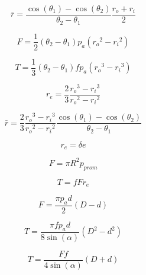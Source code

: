 \documentclass[12pt, letterpaper]{extarticle}
\begin{document}
\begin{equation*}
    \bar{r} = \frac{\cos(\theta_{1}) - \cos(\theta_{2})}{\theta_{2} - \theta_{1}} \frac{r_{o} + r_{i}}{2}
\end{equation*}


\begin{equation*}
    F = \frac{1}{2}(\theta_{2} - \theta_{1})p_{a}({r_{o}}^{2} - {r_{i}}^{2})
\end{equation*}

\begin{equation*}
    T = \frac{1}{3}(\theta_{2} - \theta_{1})fp_{a}({r_{o}}^{3} - {r_{i}}^{3})
\end{equation*}

\begin{equation*}
    r_{e} = \frac{2}{3} \frac{{r_{o}}^{3} - {r_{i}}^{3}}{{r_{o}}^{2} - {r_{i}}^{2}}
\end{equation*}

\begin{equation*}
    \bar{r} = \frac{2}{3} \frac{{r_{o}}^{3} - {r_{i}}^{3}}{{r_{o}}^{2} - {r_{i}}^{2}} \frac{\cos(\theta_{1}) - \cos(\theta_{2})}{\theta_{2} - \theta_{1}}
\end{equation*}

\newpage
{}

\begin{equation*}
    r_{e} = \delta e
\end{equation*}

\begin{equation*}
    F = \pi R^{2} p_{prom}
\end{equation*}

\begin{equation*}
    T = fFr_{e}
\end{equation*}



\begin{equation*}
    F = \frac{\pi p_{a}d}{2}(D - d)
\end{equation*}

\begin{equation*}
    T = \frac{\pi fp_{a}d}{8\sin(\alpha)}(D^{2} - d^{2})
\end{equation*}

\begin{equation*}
    T = \frac{Ff}{4\sin(\alpha)}(D + d)
\end{equation*}
\end{document}
